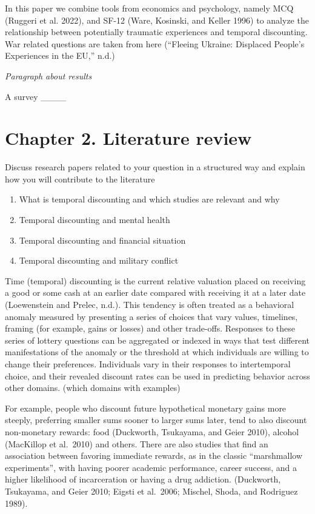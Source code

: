 \documentclass[
  letterpaper,
  DIV=11,
  numbers=noendperiod]{scrartcl}
\providecommand{\tightlist}{%
  \setlength{\itemsep}{0pt}\setlength{\parskip}{0pt}}\usepackage{longtable,booktabs,array}
\begin{document}
In this paper we combine tools from economics and psychology, namely MCQ
(Ruggeri et al. 2022), and SF-12 (Ware, Kosinski, and Keller 1996) to
analyze the relationship between potentially traumatic experiences and
temporal discounting. War related questions are taken from here
({``Fleeing Ukraine: Displaced People{'}s Experiences in the EU,''}
n.d.)

\emph{Paragraph about results}

A survey \_\_\_\_

\hypertarget{chapter-2.-literature-review}{%
\section{Chapter 2. Literature
review}\label{chapter-2.-literature-review}}

Discuss research papers related to your question in a structured way and
explain how you will contribute to the literature

\begin{enumerate}
\def\labelenumi{\arabic{enumi}.}
\tightlist
\item
  What is temporal discounting and which studies are relevant and why
\item
  Temporal discounting and mental health
\item
  Temporal discounting and financial situation
\item
  Temporal discounting and military conflict
\end{enumerate}

Time (temporal) discounting is the current relative valuation placed on
receiving a good or some cash at an earlier date compared with receiving
it at a later date (Loewenstein and Prelec, n.d.). This tendency is
often treated as a behavioral anomaly measured by presenting a series of
choices that vary values, timelines, framing (for example, gains or
losses) and other trade-offs. Responses to these series of lottery
questions can be aggregated or indexed in ways that test different
manifestations of the anomaly or the threshold at which individuals are
willing to change their preferences. Individuals vary in their responses
to intertemporal choice, and their revealed discount rates can be used
in predicting behavior across other domains. (which domains with
examples)

For example, people who discount future hypothetical monetary gains more
steeply, preferring smaller sums sooner to larger sums later, tend to
also discount non-monetary rewards: food (Duckworth, Tsukayama, and
Geier 2010), alcohol (MacKillop et al.~2010) and others. There are also
studies that find an association between favoring immediate rewards, as
in the classic ``marshmallow experiments'', with having poorer academic
performance, career success, and a higher likelihood of incarceration or
having a drug addiction. (Duckworth, Tsukayama, and Geier 2010; Eigsti
et al.~2006; Mischel, Shoda, and Rodriguez 1989).
\end{document}
